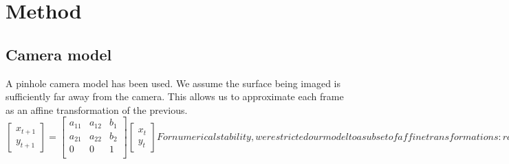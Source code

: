 \section{Method}
\subsection{Camera model}

A pinhole camera model has been used.
We assume the surface being imaged is sufficiently far away from the camera.
This allows us to approximate each frame as an affine transformation of the previous.
\begin{equation}
  \begin{bmatrix}
    x_{t+1}\\
    y_{t+1}
  \end{bmatrix}
  =
  \begin{bmatrix}
    a_{11} & a_{12} & b_{1} \\
    a_{21} & a_{22} & b_{2} \\
    0      & 0      & 1 \\
  \end{bmatrix}
  \begin{bmatrix}
    x_t \\
    y_t
  \end{bmatrix}
For numerical stability, we restricted our model to a subset of affine transformations:
rotation, scaling and translation.
This reduces the degree of freedom to four.
\end{equation}

